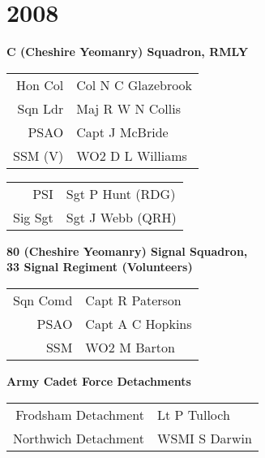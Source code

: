 \chapter*{2008}

\vspace*{10mm}

\begin{center}
  \Large
  \textbf{C (Cheshire Yeomanry) Squadron, RMLY}
\end{center}

\begin{center}
  \begin{tabular}{rl}
    Hon Col & Col N C Glazebrook \\
    Sqn Ldr & Maj R W N Collis \\
    PSAO & Capt J McBride \\
    SSM (V) & WO2 D L Williams \\
  \end{tabular}
\end{center}

\begin{center}
  \begin{tabular}{rl}
    PSI & Sgt P Hunt (RDG) \\
    Sig Sgt & Sgt J Webb (QRH) \\
  \end{tabular}
\end{center}

\vspace*{10mm}

\begin{center}
  \Large
  \textbf{80 (Cheshire Yeomanry) Signal Squadron, \\ 33 Signal Regiment (Volunteers)}
\end{center}

\begin{center}
  \begin{tabular}{rl}
    Sqn Comd & Capt R Paterson \\
    PSAO & Capt A C Hopkins \\
    SSM & WO2 M Barton \\
  \end{tabular}
\end{center}

\vspace*{10mm}

\begin{center}
  \Large
  \textbf{Army Cadet Force Detachments}
\end{center}

\begin{center}
  \begin{tabular}{rl}
    Frodsham Detachment & Lt P Tulloch \\
    Northwich Detachment & WSMI S Darwin \\
  \end{tabular}
\end{center}
